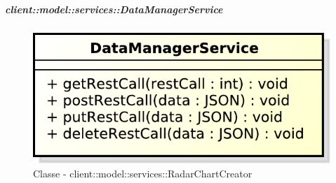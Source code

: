 		\subparagraph{client::model::services::DataManagerService} %
		\label{subp:radarchartcreator}
		\begin{figure}[htbp]
				\centering
				\centerline{\includegraphics[scale=0.7]{./images/client/classes/model/data_manager_service.pdf}}
				\caption{Classe - client::model::services::RadarChartCreator}
			\end{figure}
